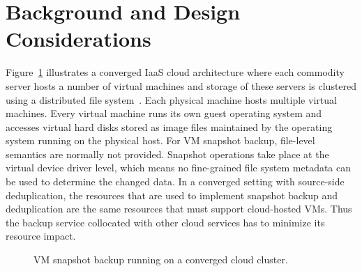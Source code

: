 \section{Background and Design Considerations}
\label{sect:background}

Figure~\ref{fig:collocated} illustrates a converged IaaS cloud architecture 
where
each commodity server hosts a number of virtual machines and storage of these servers
is clustered using a distributed file system~\cite{googlefs03,hdfs10}.
Each physical machine hosts multiple virtual machines.  Every virtual machine
runs its own guest operating system and accesses virtual hard disks 
stored as image files maintained by the operating system running on the
physical host. 
For VM snapshot backup, file-level semantics are normally not provided.
Snapshot operations take place at the virtual device driver level, which
means no fine-grained file system metadata can be used to determine the changed data. 
In a converged setting with source-side deduplication, the resources that are used to implement snapshot
backup and deduplication are the same resources that must support cloud-hosted
VMs.  Thus the backup service collocated with 
other cloud services has to minimize its resource impact.  





\begin{figure}[htb]
    \centering
    \resizebox{0.85\linewidth}{!}{
        
    }
    \caption{VM snapshot backup running on a converged cloud cluster.}
    \label{fig:collocated}
\end{figure}

